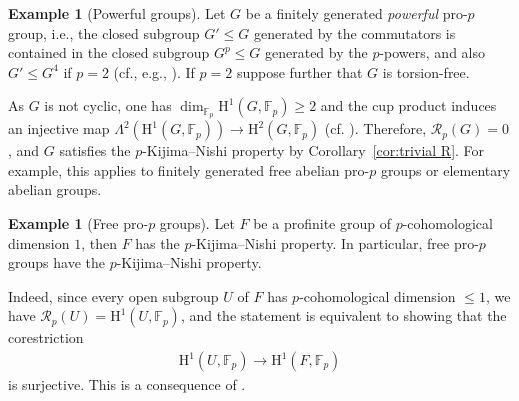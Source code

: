 \documentclass{amsart}
\theoremstyle{definition}
\newtheorem{ex}[thm]{Example}
\theoremstyle{remark}
\newcommand{\FF}{\mathbb{F}}
\newcommand{\calR}{\mathcal{R}}
\newcommand{\rmH}{\mathrm H}%
\newcommand{\F}{\FF}
\begin{document}
\begin{ex}[Powerful groups]
\label{ex:powerful groups}
    Let $G$ be a finitely generated {\sl powerful} pro-$p$ group, i.e., the closed subgroup $G'\leq G$ generated by the commutators is contained in the closed subgroup $G^p\leq G$ generated by the $p$-powers, and also $G'\leq G^4$ if $p=2$ (cf., e.g., \cite[Def.~3.1]{DdSMS}). If $p=2$ suppose further that $G$ is torsion-free. 

    As $G$ is not cyclic, one has $\dim_{\FF_p}\rmH^1(G,\FF_p)\geq 2$ and the cup product induces an injective map $\Lambda^2(\rmH^1(G,\FF_p))\to \rmH^2(G,\FF_p)$ (cf. \cite[Thm.~5.1.6 and Cor~5.1.7]{SymondsWeigel}). Therefore, $\calR_p(G)=0$, and $G$ satisfies the $p$-Kijima--Nishi property by Corollary~\ref{cor:trivial R}. For example, this applies to finitely generated free abelian pro-$p$ groups or elementary abelian groups.
\end{ex}
\begin{ex}[Free pro-$p$ groups]
\label{ex:KNFree}
    Let $F$ be a profinite group of $p$-cohomological dimension $1$, then $F$ has the $p$-Kijima--Nishi property. In particular, free pro-$p$ groups have the $p$-Kijima--Nishi property. 

    Indeed, since every open subgroup $U$ of $F$ has $p$-cohomological dimension $\leq 1 $, we have $\calR_p(U)=\rmH^1(U,\F_p)$, and the statement is equivalent to showing that the corestriction
    \begin{align*}
        \rmH^1(U,\FF_p)\to \rmH^1(F,\FF_p)
    \end{align*} 
    is surjective. This is a consequence of \cite[Prop. 3.3.11]{NSW2008}.
\end{ex}
\end{document}
